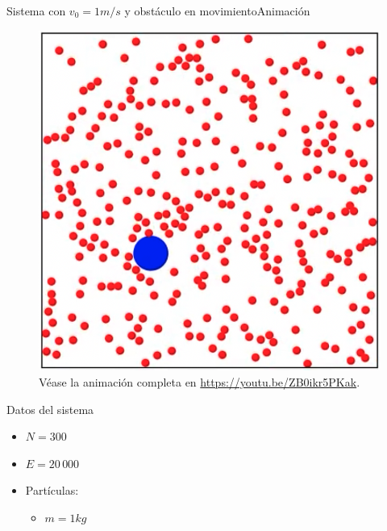 \documentclass{beamer}
\begin{document}
            \begin{frame}{Sistema con $v_0=1m/s$ y obstáculo en movimiento}{Animación}
                \begin{minipage}[t]{0.60\textwidth}
                    \begin{figure}[H!]
                        \includegraphics[height=.65\textheight]{./animation_obstacle_moves_v_1}
                        \caption*{Véase la animación completa en \url{https://youtu.be/ZB0ikr5PKak}.}
                        \label{fig:a_5}
                    \end{figure}
                \end{minipage}
                \hfill
                \begin{minipage}[t]{0.30\textwidth}
                    \begin{block}{Datos del sistema}
                        \begin{itemize}
                            \item $N=300$
                            \item $E=20\,000$
                            \item Partículas:
                            \begin{itemize}
                                \item $m = 1 kg$

\end{itemize}
\end{itemize}
\end{block}
\end{minipage}
\end{frame}
\end{document}
